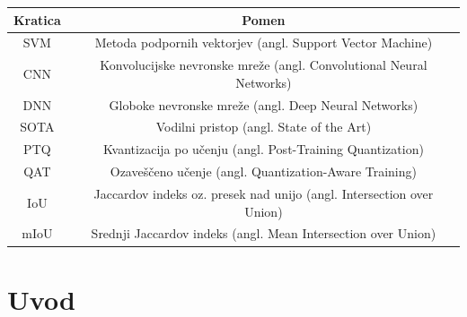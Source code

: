 \documentclass[a4paper,twoside,openright,12pt,slovene]{book}
\begin{document}
\begin{center}
    \begin{tabular}{c c}
        \toprule
        \textbf{Kratica} & \textbf{Pomen} \\
        \midrule
        SVM     & Metoda podpornih vektorjev (angl. Support Vector Machine) \\
        CNN     & Konvolucijske nevronske mreže (angl. Convolutional Neural Networks) \\ 
        DNN     & Globoke nevronske mreže (angl. Deep Neural Networks) \\
        SOTA    & Vodilni pristop (angl. State of the Art) \\
        PTQ     & Kvantizacija po učenju (angl. Post-Training Quantization) \\
        QAT     & Ozaveščeno učenje (angl. Quantization-Aware Training) \\
        IoU     & Jaccardov indeks oz. presek nad unijo (angl. Intersection over Union) \\
        mIoU    & Srednji Jaccardov indeks (angl. Mean Intersection over Union) \\
        \bottomrule
    \end{tabular}
\end{center}

\mainmatter

\chapter{Uvod} \label{sct:uvod}


\end{document}
